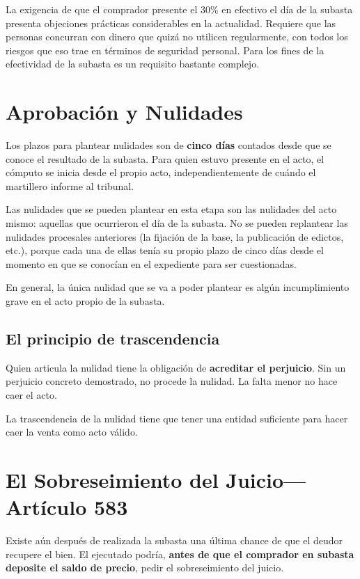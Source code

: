 \documentclass[12pt,oneside]{book}
\begin{document}
La exigencia de que el comprador presente el 30\% en efectivo el día de la subasta presenta objeciones prácticas considerables en la actualidad. Requiere que las personas concurran con dinero que quizá no utilicen regularmente, con todos los riesgos que eso trae en términos de seguridad personal. Para los fines de la efectividad de la subasta es un requisito bastante complejo.

\section{Aprobación y Nulidades}

Los plazos para plantear nulidades son de \textbf{cinco días} contados desde que se conoce el resultado de la subasta. Para quien estuvo presente en el acto, el cómputo se inicia desde el propio acto, independientemente de cuándo el martillero informe al tribunal.

\begin{important}
Las nulidades que se pueden plantear en esta etapa son las nulidades del acto mismo: aquellas que ocurrieron el día de la subasta. No se pueden replantear las nulidades procesales anteriores (la fijación de la base, la publicación de edictos, etc.), porque cada una de ellas tenía su propio plazo de cinco días desde el momento en que se conocían en el expediente para ser cuestionadas.

En general, la única nulidad que se va a poder plantear es algún incumplimiento grave en el acto propio de la subasta.
\end{important}

\subsection{El principio de trascendencia}

Quien articula la nulidad tiene la obligación de \textbf{acreditar el perjuicio}. Sin un perjuicio concreto demostrado, no procede la nulidad. La falta menor no hace caer el acto.

La trascendencia de la nulidad tiene que tener una entidad suficiente para hacer caer la venta como acto válido.

\section{El Sobreseimiento del Juicio---Artículo 583}

Existe aún después de realizada la subasta una última chance de que el deudor recupere el bien. El ejecutado podría, \textbf{antes de que el comprador en subasta deposite el saldo de precio}, pedir el sobreseimiento del juicio.
\end{document}
